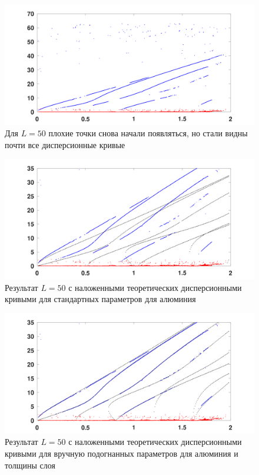 \documentclass{article}
\begin{document}
	\begin{figure}[!h]
		\begin{center}
			\includegraphics[width=0.9\linewidth]{images/matrix_pencil_method/dx_L_filter_near_L=50_with_bad_points.png}
			\caption{Для $L=50$ плохие точки снова начали появляться, но стали видны почти все дисперсионные кривые}
		\end{center}
	\end{figure}
	
	
	\begin{figure}[!h]
		\begin{center}
			\includegraphics[width=0.9\linewidth]{images/matrix_pencil_method/dx_L_filter_near_L=50_with_teoretical_dispersion_curves.png}
			\caption{Результат $L=50$ с наложенными теоретических дисперсионными кривыми для стандартных параметров для алюминия}
		\end{center}
	\end{figure}
	
	\begin{figure}[!h]
		\begin{center}
			\includegraphics[width=0.9\linewidth]{images/matrix_pencil_method/dx_L_filter_near_L=50_with_adapted_teoretical_dispersion_curves.png}
			\caption{Результат $L=50$ с наложенными теоретических дисперсионными кривыми для вручную подогнанных параметров для алюминия и толщины слоя}
		\end{center}
	\end{figure}
	
\end{document}
